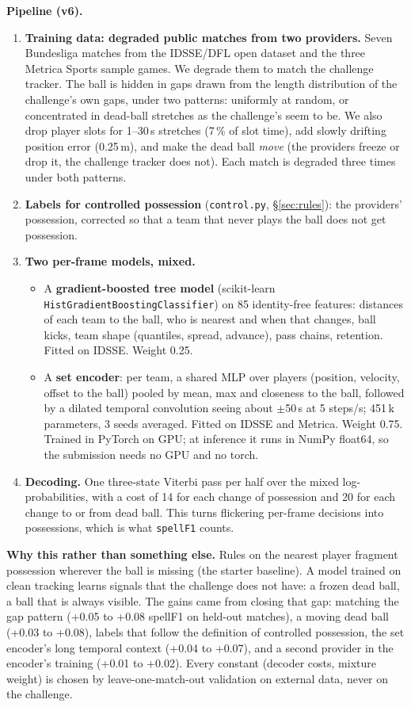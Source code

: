 \documentclass[10pt,a4paper]{article}
\newcommand{\code}[1]{\texttt{#1}}
\begin{document}
\textbf{Pipeline (v6).}
\begin{enumerate}
\item \textbf{Training data: degraded public matches from two providers.} Seven Bundesliga matches
  from the IDSSE/DFL open dataset and the three Metrica Sports sample games. We degrade them to match
  the challenge tracker. The ball is hidden in gaps drawn from the length distribution of the
  challenge's own gaps, under two patterns: uniformly at random, or concentrated in dead-ball
  stretches as the challenge's seem to be. We also drop player slots for 1--30\,s stretches
  (7\,\% of slot time), add slowly drifting position error (0.25\,m), and make the dead ball
  \emph{move} (the providers freeze or drop it, the challenge tracker does not). Each match is
  degraded three times under both patterns.
\item \textbf{Labels for controlled possession} (\code{control.py}, \S\ref{sec:rules}): the
  providers' possession, corrected so that a team that never plays the ball does not get possession.
\item \textbf{Two per-frame models, mixed.}
  \begin{itemize}
  \item A \textbf{gradient-boosted tree model} (scikit-learn \code{HistGradientBoostingClassifier})
    on 85 identity-free features: distances of each team to the ball, who is nearest and when that
    changes, ball kicks, team shape (quantiles, spread, advance), pass chains, retention. Fitted on
    IDSSE. Weight 0.25.
  \item A \textbf{set encoder}: per team, a shared MLP over players (position, velocity, offset to
    the ball) pooled by mean, max and closeness to the ball, followed by a dilated temporal
    convolution seeing about $\pm$50\,s at 5 steps/s; 451\,k parameters, 3 seeds averaged. Fitted
    on IDSSE and Metrica. Weight 0.75. Trained in PyTorch on GPU; at inference it runs in NumPy
    float64, so the submission needs no GPU and no torch.
  \end{itemize}
\item \textbf{Decoding.} One three-state Viterbi pass per half over the mixed log-probabilities,
  with a cost of 14 for each change of possession and 20 for each change to or from dead ball.
  This turns flickering per-frame decisions into possessions, which is what \code{spellF1} counts.
\end{enumerate}

\textbf{Why this rather than something else.} Rules on the nearest player fragment possession
wherever the ball is missing (the starter baseline). A model trained on clean tracking learns
signals that the challenge does not have: a frozen dead ball, a ball that is always visible. The
gains came from closing that gap: matching the gap pattern (+0.05 to +0.08 spellF1 on held-out
matches), a moving dead ball (+0.03 to +0.08), labels that follow the definition of controlled
possession, the set encoder's long temporal context (+0.04 to +0.07), and a second provider in the
encoder's training (+0.01 to +0.02). Every constant (decoder costs, mixture weight) is chosen by
leave-one-match-out validation on external data, never on the challenge.
\end{document}
